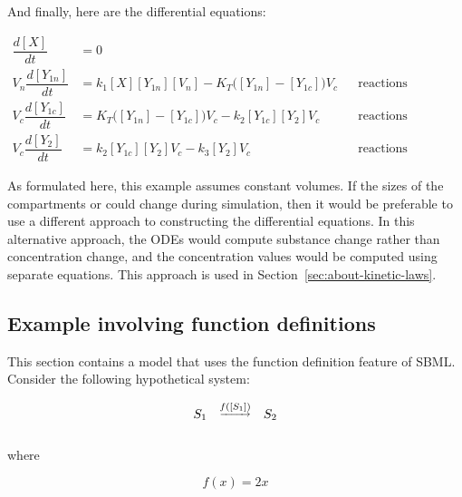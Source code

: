 And finally, here are the differential equations:
\begin{linenomath}
\begin{align*}
  \dfrac{d [X]}{d t}    &= 0 \\[6pt]
  V_n \dfrac{d [Y_{1n}]}{d t} &= k_1 [X] [Y_{1n}] [V_n] - K_T \big([Y_{1n}] - [Y_{1c}]\big) V_c
    && \text{reactions production and transport} \\[6pt]
  V_c \dfrac{d [Y_{1c}]}{d t} &= K_T \big([Y_{1n}] - [Y_{1c}]\big) V_c - k_2 [Y_{1c}] [Y_2] V_c
    && \text{reactions transport and transformation} \\[6pt]
  V_c \dfrac{d [Y_2]}{d t}    &= k_2 [Y_{1c}] [Y_2] V_c - k_3 [Y_2] V_c
    && \text{reactions transformation and degradation}
\end{align*}
\end{linenomath}

As formulated here, this example assumes constant volumes.  If the
sizes of the compartments  or  could
change during simulation, then it would be preferable to use a
different approach to constructing the differential equations.  In
this alternative approach, the ODEs would compute substance change
rather than concentration change, and the concentration values
would be computed using separate equations.  This approach is used
in Section~\ref{sec:about-kinetic-laws}.


\subsection{Example involving function definitions}
\label{sec:functioneg}

This section contains a model that uses the function definition
feature of SBML.  Consider the following hypothetical system:
\begin{linenomath}
\begin{equation*}
  \begin{array}{@{}ccc@{}}
    S_1 & \overset{\underrightarrow{f([S_1])}}{} & S_2 \\ \\[-4pt]
  \end{array}
\end{equation*}
\end{linenomath}
where
\begin{linenomath}
\begin{equation*}
    f(x) = 2 x
\end{equation*}
\end{linenomath}

